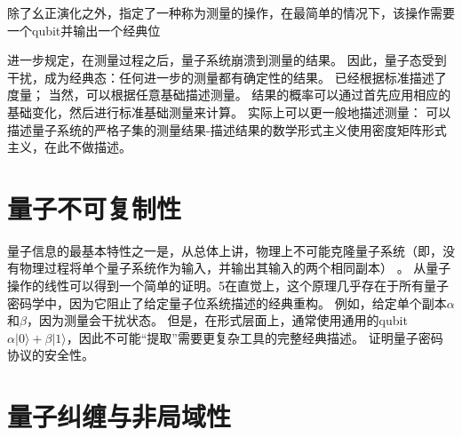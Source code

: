 除了幺正演化之外，指定了一种称为测量的操作，在最简单的情况下，该操作需要一个qubit并输出一个经典位

进一步规定，在测量过程之后，量子系统崩溃到测量的结果。 因此，量子态受到干扰，成为经典态：任何进一步的测量都有确定性的结果。 已经根据标准描述了度量； 当然，可以根据任意基础描述测量。 结果的概率可以通过首先应用相应的基础变化，然后进行标准基础测量来计算。 实际上可以更一般地描述测量： 可以描述量子系统的严格子集的测量结果-描述结果的数学形式主义使用密度矩阵形式主义，在此不做描述。\textcite{Broadbent2016}



\section{量子不可复制性}


量子信息的最基本特性之一是，从总体上讲，物理上不可能克隆量子系统（即，没有物理过程将单个量子系统作为输入，并输出其输入的两个相同副本） 。 从量子操作的线性可以得到一个简单的证明。5在直觉上，这个原理几乎存在于所有量子密码学中，因为它阻止了给定量子位系统描述的经典重构。 例如，给定单个副本$\alpha$和$\beta$，因为测量会干扰状态。 但是，在形式层面上，通常使用通用的qubit $\alpha\vert 0\rangle + \beta\vert 1\rangle$，因此不可能“提取”需要更复杂工具的完整经典描述。 证明量子密码协议的安全性。

\section{量子纠缠与非局域性}

